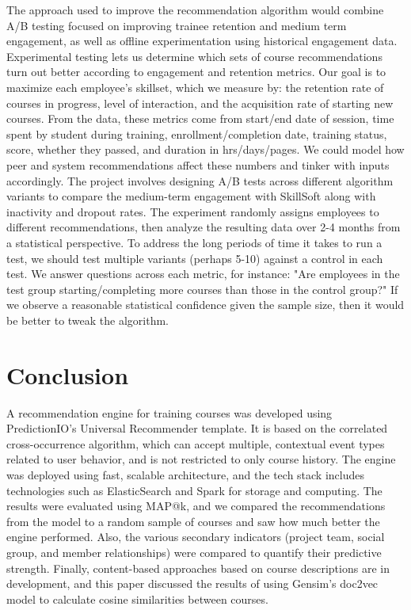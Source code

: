 \documentclass[12pt,journal]{IEEEtran}
\begin{document}
The approach used to improve the recommendation algorithm would combine A/B testing focused on improving trainee retention and medium term engagement, as well as offline experimentation using historical engagement data.  Experimental testing lets us determine which sets of course recommendations turn out better according to engagement and retention metrics.  Our goal is to maximize each employee's skillset, which we measure by: the retention rate of courses in progress, level of interaction, and the acquisition rate of starting new courses.  From the data, these metrics come from start/end date of session, time spent by student during training, enrollment/completion date, training status, score, whether they passed, and duration in hrs/days/pages.  We could model how peer and system recommendations affect these numbers and tinker with inputs accordingly.
The project involves designing A/B tests across different algorithm variants to compare the medium-term engagement with SkillSoft along with inactivity and dropout rates.  The experiment randomly assigns employees to different recommendations, then analyze the resulting data over 2-4 months from a statistical perspective.  To address the long periods of time it takes to run a test, we should test multiple variants (perhaps 5-10) against a control in each test.  We answer questions across each metric, for instance: "Are employees in the test group starting/completing more courses than those in the control group?"  If we observe a reasonable statistical confidence given the sample size, then it would be better to tweak the algorithm.

\section{Conclusion}
A recommendation engine for training courses was developed using PredictionIO's Universal Recommender template.  It is based on the correlated cross-occurrence algorithm, which can accept multiple, contextual event types related to user behavior, and is not restricted to only course history.  The engine was deployed using fast, scalable architecture, and the tech stack includes technologies such as ElasticSearch and Spark for storage and computing.  The results were evaluated using MAP@k, and we compared the recommendations from the model to a random sample of courses and saw how much better the engine performed.  Also, the various secondary indicators (project team, social group, and member relationships) were compared to quantify their predictive strength.  Finally, content-based approaches based on course descriptions are in development, and this paper discussed the results of using Gensim's doc2vec model to calculate cosine similarities between courses.
\end{document}
